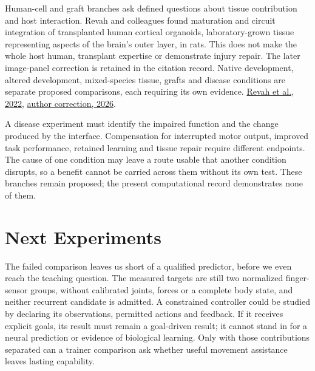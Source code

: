 Human-cell and graft branches ask defined questions about tissue contribution and host interaction. Revah and colleagues found maturation and circuit integration of transplanted human cortical organoids, laboratory-grown tissue representing aspects of the brain's outer layer, in rats. This does not make the whole host human, transplant expertise or demonstrate injury repair. The later image-panel correction is retained in the citation record. Native development, altered development, mixed-species tissue, grafts and disease conditions are separate proposed comparisons, each requiring its own evidence. \href{https://www.nature.com/articles/s41586-022-05277-w}{Revah et al., 2022}, \href{https://www.nature.com/articles/s41586-026-10943-4}{author correction, 2026}.\par

A disease experiment must identify the impaired function and the change produced by the interface. Compensation for interrupted motor output, improved task performance, retained learning and tissue repair require different endpoints. The cause of one condition may leave a route usable that another condition disrupts, so a benefit cannot be carried across them without its own test. These branches remain proposed; the present computational record demonstrates none of them.\par

\section{Next Experiments}

The failed comparison leaves us short of a qualified predictor, before we even reach the teaching question. The measured targets are still two normalized finger-sensor groups, without calibrated joints, forces or a complete body state, and neither recurrent candidate is admitted. A constrained controller could be studied by declaring its observations, permitted actions and feedback. If it receives explicit goals, its result must remain a goal-driven result; it cannot stand in for a neural prediction or evidence of biological learning. Only with those contributions separated can a trainer comparison ask whether useful movement assistance leaves lasting capability.\par

